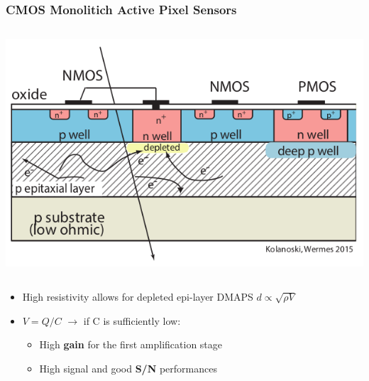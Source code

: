     \begin{frame}
        \frametitle{CMOS Monolitich Active Pixel Sensors}
        \begin{columns}
                \vspace*{-0.5cm}
                \hspace*{+1.2cm}
                \includegraphics[width=0.9\linewidth]{figures/Pixel_detectors/MAPS_scheme.png}
            \end{columns}   
        \medskip         
        \begin{itemize}
            \item High resistivity allows for depleted epi-layer DMAPS
            \hspace{40pt}$d \propto \sqrt{\rho V}$
            \item $V = Q/C$ $\rightarrow$ if C is sufficiently low:
            \begin{itemize}
                \item High \textbf{gain} for the first amplification stage
                \item High signal and good \textbf{S/N} performances  

\end{itemize}
\end{itemize}
\end{frame}
